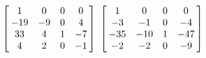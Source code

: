 {$ \left[\hskip -3pt \begin{array}{cccc} 1&0&0&0\\  -19&-9&0&4
\\  33&4&1&-7\\  4&2&0&-1\end {array} \hskip -3pt
 \right] $ 
}
{$ \left[\hskip -3pt \begin{array}{cccc} 1&0&0&0\\  -3&-1&0&-4
\\  -35&-10&1&-47\\  -2&-2&0&-9
\end{array}\hskip -3pt \right] $}
